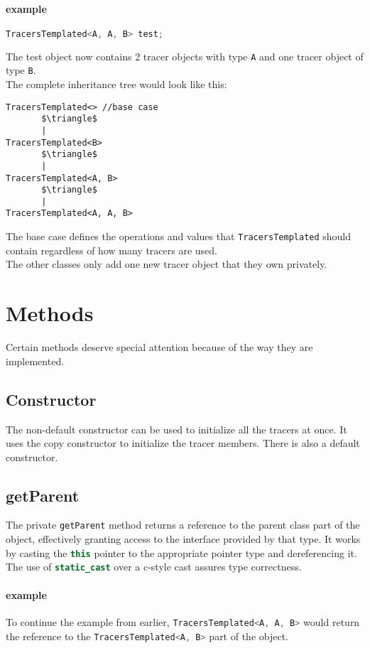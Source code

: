 \documentclass[12pt]{article}
\newcommand{\inlinecpp}[1]{\lstinline[language=c++]{#1}}
\begin{document}
\paragraph{example}
\begin{lstlisting}[language=c++]
TracersTemplated<A, A, B> test;
\end{lstlisting}
The test object now contains 2 tracer objects with type \inlinecpp{A} and one tracer object of type \inlinecpp{B}.\\
The complete inheritance tree would look like this:
\begin{lstlisting}
TracersTemplated<> //base case
       $\triangle$
       |
TracersTemplated<B>
       $\triangle$
       |
TracersTemplated<A, B>
       $\triangle$
       |
TracersTemplated<A, A, B>
\end{lstlisting}
The base case defines the operations and values that \inlinecpp{TracersTemplated} should contain regardless of how many tracers are used.\\
The other classes only add one new tracer object that they own privately.


\section{Methods}
Certain methods deserve special attention because of the way they are implemented.
\subsection{Constructor}
The non-default constructor can be used to initialize all the tracers at once. It uses the copy constructor to initialize the tracer members. There is also a default constructor.
\subsection{getParent}
The private \inlinecpp{getParent} method returns a reference to the parent class part of the object, effectively granting access to the interface provided by that type. It works by casting the \inlinecpp{this} pointer to the appropriate pointer type and dereferencing it. The use of \inlinecpp{static_cast} over a c-style cast assures type correctness.
\paragraph{example}
To continue the example from earlier, \inlinecpp{TracersTemplated<A, A, B>} would return the reference to the \inlinecpp{TracersTemplated<A, B>} part of the object.
\end{document}
